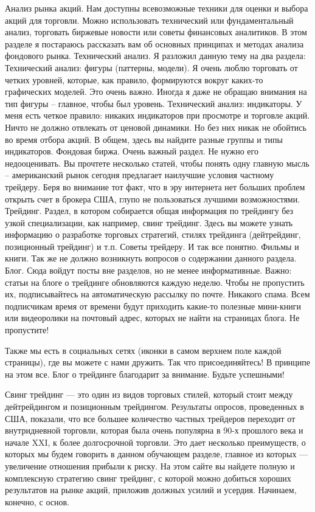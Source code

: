 \documentclass{book}
\begin{document}
Анализ рынка акций. Нам доступны всевозможные техники для оценки и выбора акций для торговли. Можно использовать технический или фундаментальный анализ, торговать биржевые новости или советы финансовых аналитиков. В этом разделе я постараюсь рассказать вам об основных принципах и методах анализа фондового рынка.
Технический анализ. Я разложил данную тему на два раздела:
Технический анализ: фигуры (паттерны, модели). Я очень люблю торговать от четких уровней, которые, как правило, формируются вокруг каких-то графических моделей. Это очень важно. Иногда я даже не обращаю внимания на тип фигуры – главное, чтобы был уровень.
Технический анализ: индикаторы. У меня есть четкое правило: никаких индикаторов при просмотре и торговле акций. Ничто не должно отвлекать от ценовой динамики. Но без них никак не обойтись во время отбора акций. В общем, здесь вы найдите разные группы и типы индикаторов.
Фондовая биржа. Очень важный раздел. Не нужно его недооценивать. Вы прочтете несколько статей, чтобы понять одну главную мысль – американский рынок сегодня предлагает наилучшие условия частному трейдеру. Беря во внимание тот факт, что в эру интернета нет больших проблем открыть счет в брокера США, глупо не пользоваться лучшими возможностями.
Трейдинг. Раздел, в котором собирается общая информация по трейдингу без узкой специализации, как например, свинг трейдинг. Здесь вы можете узнать информацию о разработке торговых стратегий, стилях трейдинга (дейтрейдинг, позиционный трейдинг) и т.п.
Советы трейдеру. И так все понятно.
Фильмы и книги. Так же не должно возникнуть вопросов о содержании данного раздела.
Блог. Сюда войдут посты вне разделов, но не менее информативные.
Важно: статьи на блоге о трейдинге обновляются каждую неделю. Чтобы не пропустить их, подписывайтесь на автоматическую рассылку по почте. Никакого спама. Всем подписчикам время от времени будут приходить какие-то полезные мини-книги или видеоролики на почтовый адрес, которых не найти на страницах блога. Не пропустите!

Также мы есть в социальных сетях (иконки в самом верхнем поле каждой страницы), где вы можете с нами дружить. Так что присоединяйтесь! В принципе на этом все. Блог о трейдинге благодарит за внимание. Будьте успешными!

Свинг трейдинг — это один из видов торговых стилей, который стоит между дейтрейдингом и позиционным трейдингом. Результаты опросов, проведенных в США, показали, что все большее количество частных трейдеров переходит от внутридневной торговли, которая была очень популярна в 90-х прошлого века и начале XXI, к более долгосрочной торговли. Это дает несколько преимуществ, о которых мы будем говорить в данном обучающем разделе, главное из которых — увеличение отношения прибыли к риску. На этом сайте вы найдете полную и комплексную стратегию свинг трейдинг, с которой можно добиться хороших результатов на рынке акций, приложив должных усилий и усердия. Начинаем, конечно, с основ.
\end{document}
